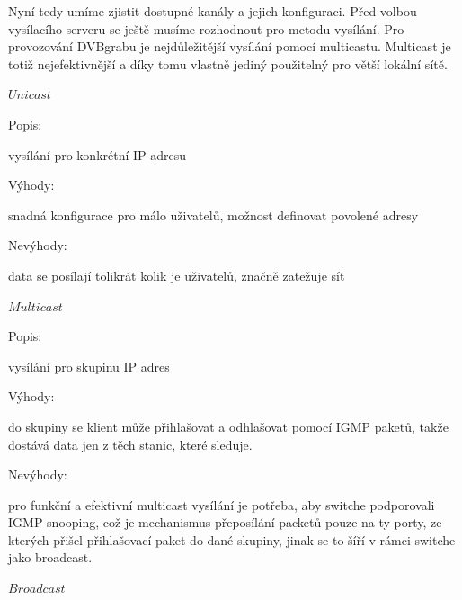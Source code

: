 \vspace{10pt}

Nyní tedy umíme zjistit dostupné kanály a jejich konfiguraci. Před volbou vysílacího serveru se ještě musíme rozhodnout pro metodu vysílání.
Pro provozování DVBgrabu je nejdůležitější vysílání pomocí multicastu. Multicast je totiž nejefektivnější a díky tomu vlastně jediný použitelný pro větší lokální sítě. 

\vspace{10pt}

\begin{bf}$Unicast$\end{bf}


\begin{bf}Popis:\end{bf} vysílání pro konkrétní IP adresu


\begin{bf}Výhody:\end{bf} snadná konfigurace pro málo uživatelů, možnost definovat povolené adresy


\begin{bf}Nevýhody:\end{bf} data se posílají tolikrát kolik je uživatelů, značně zatežuje sít

\vspace{10pt}

\begin{bf}$Multicast$\end{bf}


\begin{bf}Popis:\end{bf} vysílání pro skupinu IP adres


\begin{bf}Výhody:\end{bf} do skupiny se klient může přihlašovat a odhlašovat pomocí IGMP paketů, takže dostává data jen z těch stanic, které sleduje.


\begin{bf}Nevýhody:\end{bf} pro funkční a efektivní multicast vysílání je potřeba, aby switche podporovali IGMP snooping, což je mechanismus přeposílání packetů pouze na ty porty, ze kterých přišel přihlašovací paket do dané skupiny, jinak se to šíří v rámci switche jako broadcast.

\vspace{10pt}

\begin{bf}$Broadcast$\end{bf}
   

